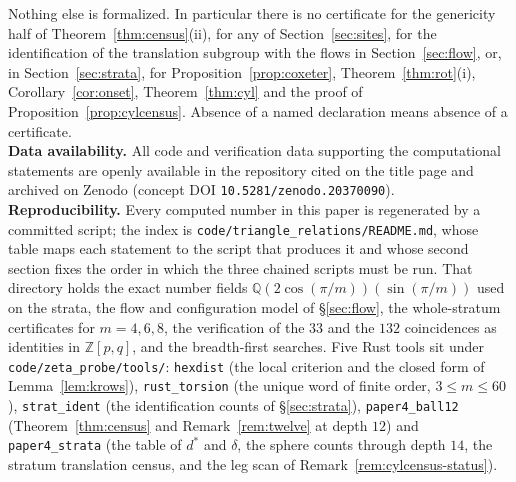 \documentclass[11pt]{article}
\theoremstyle{definition}
\theoremstyle{remark}
\newcommand{\Z}{\mathbb{Z}}
\newcommand{\Q}{\mathbb{Q}}
\begin{document}
Nothing else is formalized. In particular there is no certificate for the
genericity half of Theorem~\ref{thm:census}(ii), for any of
Section~\ref{sec:sites}, for the identification of the translation subgroup
with the flows in Section~\ref{sec:flow}, or, in Section~\ref{sec:strata}, for
Proposition~\ref{prop:coxeter}, Theorem~\ref{thm:rot}(i),
Corollary~\ref{cor:onset}, Theorem~\ref{thm:cyl} and the proof of
Proposition~\ref{prop:cylcensus}. Absence of a named declaration means absence
of a certificate.
\smallskip\\
\noindent\textbf{Data availability.} All code and verification data supporting
the computational statements are openly available in the repository cited on the
title page and archived on Zenodo (concept DOI
\texttt{10.5281/zenodo.20370090}).
\smallskip\\
\noindent\textbf{Reproducibility.} Every computed number in this paper is
regenerated by a committed script; the index is
\texttt{code/triangle\_relations/README.md}, whose table maps each statement to
the script that produces it and whose second section fixes the order in which
the three chained scripts must be run. That directory holds the exact number
fields $\Q(2\cos(\pi/m))(\sin(\pi/m))$ used on the strata, the flow and
configuration model of \S\ref{sec:flow}, the whole-stratum certificates for
$m=4,6,8$, the verification of the $33$ and the $132$ coincidences as identities
in $\Z[p,q]$, and the breadth-first searches. Five Rust tools sit under
\texttt{code/zeta\_probe/tools/}: \texttt{hexdist} (the local criterion and the
closed form of Lemma~\ref{lem:krows}), \texttt{rust\_torsion} (the unique word
of finite order, $3\le m\le60$), \texttt{strat\_ident} (the identification
counts of \S\ref{sec:strata}), \texttt{paper4\_ball12}
(Theorem~\ref{thm:census} and Remark~\ref{rem:twelve} at depth $12$) and
\texttt{paper4\_strata} (the table of $d^{*}$ and $\delta$, the sphere counts
through depth $14$, the stratum translation census, and the leg scan of
Remark~\ref{rem:cylcensus-status}).
\end{document}
